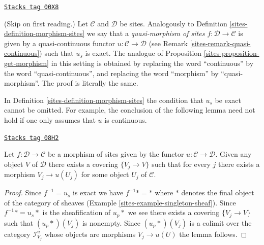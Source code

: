 \begin{remark}
\label{sites-remark-quasi-continuous-morphism-sites}
\href{https://stacks.math.columbia.edu/tag/00X8}{\texttt{Stacks tag 00X8}}

(Skip on first reading.)
Let $\mathcal{C}$ and $\mathcal{D}$ be sites. Analogously to
Definition \ref{sites-definition-morphism-sites} we say that
a {\it quasi-morphism of sites $f : \mathcal{D} \to \mathcal{C}$}
is given by a quasi-continuous functor $u : \mathcal{C} \to \mathcal{D}$
(see Remark \ref{sites-remark-quasi-continuous}) such that $u_s$ is exact.
The analogue of Proposition \ref{sites-proposition-get-morphism} in this
setting is obtained by replacing the word ``continuous''
by the word ``quasi-continuous'', and replacing the word
``morphism'' by ``quasi-morphism''. The proof is literally the
same.
\end{remark}

In Definition \ref{sites-definition-morphism-sites} the condition that $u_s$
be exact cannot be omitted. For example, the conclusion of the following
lemma need not hold if one only assumes that $u$ is continuous.

\begin{lemma}
\label{sites-lemma-morphism-of-sites-covering}
\href{https://stacks.math.columbia.edu/tag/08H2}{\texttt{Stacks tag 08H2}}

Let $f : \mathcal{D} \to \mathcal{C}$ be a morphism of sites given by the
functor $u : \mathcal{C} \to \mathcal{D}$. Given any object $V$ of
$\mathcal{D}$ there exists a covering $\{V_j \to V\}$ such that for every
$j$ there exists a morphism $V_j \to u(U_j)$ for some object $U_j$
of $\mathcal{C}$.
\end{lemma}

\begin{proof}

Since $f^{-1} = u_s$ is exact we have $f^{-1}* = *$ where $*$ denotes the
final object of the category of sheaves
(Example \ref{sites-example-singleton-sheaf}).
Since $f^{-1}* = u_s*$ is the sheafification of $u_p*$ we see
there exists a covering $\{V_j \to V\}$ such that $(u_p*)(V_j)$
is nonempty. Since $(u_p*)(V_j)$ is a colimit over the category
$\mathcal{I}^u_{V_j}$ whose objects are morphisms $V_j \to u(U)$
the lemma follows.
\end{proof}

